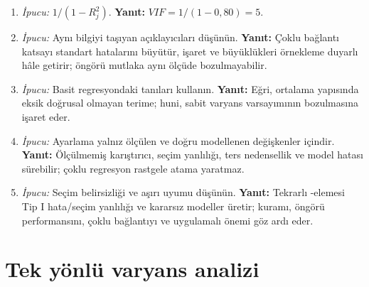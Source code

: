 \begin{enumerate}[leftmargin=*,itemsep=5pt]
\item \emph{İpucu:} $1/(1-R_j^2)$.
\textbf{Yanıt:} $VIF=1/(1-0{,}80)=5$.
\item \emph{İpucu:} Aynı bilgiyi taşıyan açıklayıcıları düşünün.
\textbf{Yanıt:} Çoklu bağlantı katsayı standart hatalarını büyütür, işaret ve
büyüklükleri örnekleme duyarlı hâle getirir; öngörü mutlaka aynı ölçüde bozulmayabilir.
\item \emph{İpucu:} Basit regresyondaki tanıları kullanın.
\textbf{Yanıt:} Eğri, ortalama yapısında eksik doğrusal olmayan terime;
huni, sabit varyans varsayımının bozulmasına işaret eder.
\item \emph{İpucu:} Ayarlama yalnız ölçülen ve doğru modellenen değişkenler içindir.
\textbf{Yanıt:} Ölçülmemiş karıştırıcı, seçim yanlılığı, ters nedensellik ve
model hatası sürebilir; çoklu regresyon rastgele atama yaratmaz.
\item \emph{İpucu:} Seçim belirsizliği ve aşırı uyumu düşünün.
\textbf{Yanıt:} Tekrarlı \pval-elemesi Tip I hata/seçim yanlılığı ve kararsız
modeller üretir; kuramı, öngörü performansını, çoklu bağlantıyı ve uygulamalı
önemi göz ardı eder.
\end{enumerate}

\section{Tek yönlü varyans analizi}

